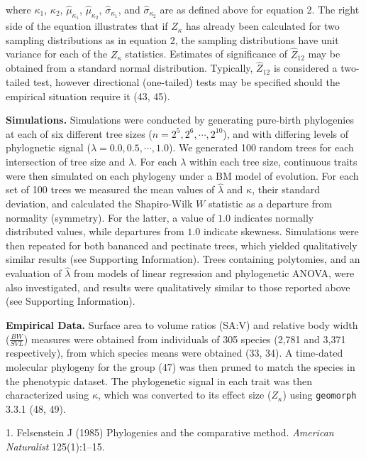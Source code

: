 \documentclass[9pt,twocolumn,twoside,lineno]{pnas-new}
\begin{document}
where \(\kappa_1\), \(\kappa_2\), \(\hat\mu_{\kappa_1}\),
\(\hat\mu_{\kappa_2}\), \(\hat\sigma_{\kappa_1}\), and
\(\hat\sigma_{\kappa_2}\) are as defined above for equation 2. The right
side of the equation illustrates that if \(Z_\kappa\) has already been
calculated for two sampling distributions as in equation 2, the sampling
distributions have unit variance for each of the \(Z_\kappa\)
statistics. Estimates of significance of \(\hat{Z}_{12}\) may be
obtained from a standard normal distribution. Typically,
\(\hat{Z}_{12}\) is considered a two-tailed test, however directional
(one-tailed) tests may be specified should the empirical situation
require it (43, 45).

\textbf{Simulations.} Simulations were conducted by generating
pure-birth phylogenies at each of six different tree sizes
(\(n=2^5, 2^6, \cdots, 2^{10}\)), and with differing levels of
phylognetic signal (\(\lambda=0.0, 0.5, \cdots, 1.0\)). We generated 100
random trees for each intersection of tree size and \(\lambda\). For
each \(\lambda\) within each tree size, continuous traits were then
simulated on each phylogeny under a BM model of evolution. For each set
of 100 trees we measured the mean values of \(\hat{\lambda}\) and
\(\kappa\), their standard deviation, and calculated the Shapiro-Wilk
\(W\) statistic as a departure from normality (symmetry). For the
latter, a value of \(1.0\) indicates normally distributed values, while
departures from \(1.0\) indicate skewness. Simulations were then
repeated for both bananced and pectinate trees, which yielded
qualitatively similar results (see Supporting Information). Trees
containing polytomies, and an evaluation of \(\hat{\lambda}\) from
models of linear regression and phylogenetic ANOVA, were also
investigated, and results were qualitatively similar to those reported
above (see Supporting Information).

\textbf{Empirical Data.} Surface area to volume ratios (SA:V) and
relative body width (\(\frac{BW}{SVL}\)) measures were obtained from
individuals of 305 species (2,781 and 3,371 respectively), from which
species means were obtained (33, 34). A time-dated molecular phylogeny
for the group (47) was then pruned to match the species in the
phenotypic dataset. The phylogenetic signal in each trait was then
characterized using \(\kappa\), which was converted to its effect size
(\(Z_\kappa\)) using \texttt{geomorph} 3.3.1 (48, 49).

\showmatmethods
\showacknow
\pnasbreak

\hypertarget{refs}{}
\leavevmode\hypertarget{ref-Felsenstein1985}{}%
1. Felsenstein J (1985) Phylogenies and the comparative method.
\emph{American Naturalist} 125(1):1--15.
\end{document}
